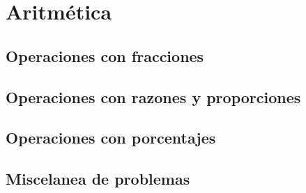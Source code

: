 \chapter{Aritmética}
\section{Operaciones con fracciones}
\section{Operaciones con razones y proporciones}
\section{Operaciones con porcentajes}
\section{Miscelanea de problemas}